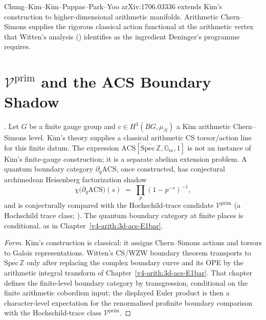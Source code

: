 \begin{remark}
Chung--Kim--Kim--Pappas--Park--Yoo arXiv:1706.03336 extends Kim's
construction to higher-dimensional arithmetic manifolds.
Arithmetic Chern--Simons supplies the rigorous classical action
functional at the arithmetic vertex that Witten's analysis
() identifies as the ingredient
Deninger's programme requires.
\end{remark}

\section{\(\mathcal{V}^{\mathrm{prim}}\) and the ACS Boundary Shadow}
\label{v4-arith:ga:V-prim-as-boundary}

\begin{theorem}
\label{v4-arith:thm:arith-CS-VA-correspondence}
\ClaimStatusConjectured. Let \(G\) be a finite gauge group and
\(c\in H^{3}(BG,\mu_{N})\) a Kim arithmetic Chern--Simons level. Kim's
theory supplies a classical arithmetic CS torsor/action line for this
finite datum. The expression
\(\mathrm{ACS}[\overline{\mathrm{Spec}\,\mathbb{Z}},\mathbb{G}_{m},1]\)
is not an instance of Kim's finite-gauge construction; it is a
separate abelian extension problem. A quantum boundary category
\(\partial_{q}\mathrm{ACS}\), once constructed, has conjectural
archimedean Heisenberg factorization shadow
\begin{equation}
\chi\bigl(\partial_{q}\mathrm{ACS}\bigr)(s)\;=\;\prod_{p}(1-p^{-s})^{-1},
\end{equation}
and is conjecturally compared with the Hochschild-trace candidate
\(\mathcal{V}^{\mathrm{prim}}\) (a Hochschild trace class;
). The quantum boundary category
at finite places is conditional, as in Chapter~\ref{v4-arith:3d-acs-E1bar}.
\end{theorem}

\begin{proof}[Form]
Kim's construction is classical: it assigns Chern--Simons actions
and torsors to Galois representations. Witten's CS/WZW boundary
theorem transports to \(\overline{\mathrm{Spec}\,\mathbb{Z}}\) only
after replacing the complex boundary curve and its OPE by the
arithmetic integral transform of Chapter~\ref{v4-arith:3d-acs-E1bar}.
That chapter defines the finite-level boundary category by
transgression, conditional on the finite arithmetic cobordism input;
the displayed Euler product is then a character-level expectation for
the renormalised profinite boundary comparison with the
Hochschild-trace class \(\mathcal{V}^{\mathrm{prim}}\).
\end{proof}

